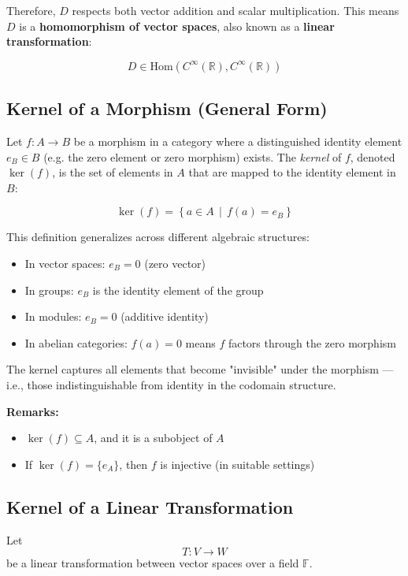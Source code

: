 \documentclass[12pt]{article}
\begin{document}
	Therefore, \( D \) respects both vector addition and scalar multiplication.  
	This means \( D \) is a \textbf{homomorphism of vector spaces}, also known as a \textbf{linear transformation}:
	
	$$
	D \in \mathrm{Hom}(C^\infty(\mathbb{R}), C^\infty(\mathbb{R}))
	$$
	
	\subsection{Kernel of a Morphism (General Form)}
	
	Let $f: A \to B$ be a morphism in a category where a distinguished identity element \( e_B \in B \) (e.g. the zero element or zero morphism) exists. The \textit{kernel} of \( f \), denoted \( \ker(f) \), is the set of elements in \( A \) that are mapped to the identity element in \( B \):
	
	$$
	\ker(f) = \left\{ a \in A \,\middle|\, f(a) = e_B \right\}
	$$
	
	This definition generalizes across different algebraic structures:
	\begin{itemize}
		\item In vector spaces: \( e_B = 0 \) (zero vector)
		\item In groups: \( e_B \) is the identity element of the group
		\item In modules: \( e_B = 0 \) (additive identity)
		\item In abelian categories: \( f(a) = 0 \) means \( f \) factors through the zero morphism
	\end{itemize}
	
	The kernel captures all elements that become "invisible" under the morphism — i.e., those indistinguishable from identity in the codomain structure.
	
	\textbf{Remarks:}
	
	\begin{itemize}
		\item \( \ker(f) \subseteq A \), and it is a subobject of \( A \)
		\item If \( \ker(f) = \{e_A\} \), then \( f \) is injective (in suitable settings)
	\end{itemize}
	
	
	\subsection{Kernel of a Linear Transformation}
	
	Let 
	$$
	T: V \to W
	$$ 
	be a linear transformation between vector spaces over a field \( \mathbb{F} \).
	
\end{document}
